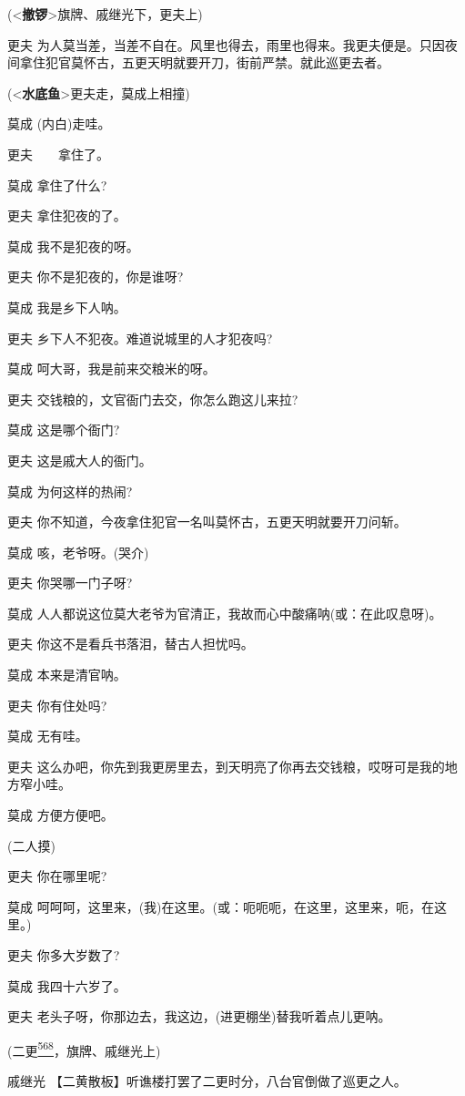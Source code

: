 (\textless{}\textbf{撤锣}\textgreater{}旗牌、戚继光下，更夫上)

更夫
为人莫当差，当差不自在。风里也得去，雨里也得来。我更夫便是。只因夜间拿住犯官莫怀古，五更天明就要开刀，街前严禁。就此巡更去者。

(\textless{}\textbf{水底鱼}\textgreater{}更夫走，莫成上相撞)

莫成 (内白)走哇。

更夫　　拿住了。

莫成 拿住了什么?

更夫 拿住犯夜的了。

莫成 我不是犯夜的呀。

更夫 你不是犯夜的，你是谁呀?

莫成 我是乡下人呐。

更夫 乡下人不犯夜。难道说城里的人才犯夜吗?

莫成 呵大哥，我是前来交粮米的呀。

更夫 交钱粮的，文官衙门去交，你怎么跑这儿来拉?

莫成 这是哪个衙门?

更夫 这是戚大人的衙门。

莫成 为何这样的热闹?

更夫 你不知道，今夜拿住犯官一名叫莫怀古，五更天明就要开刀问斩。

莫成 咳，老爷呀。(哭介)

更夫 你哭哪一门子呀?

莫成 人人都说这位莫大老爷为官清正，我故而心中酸痛呐(或：在此叹息呀)。

更夫 你这不是看兵书落泪，替古人担忧吗。

莫成 本来是清官呐。

更夫 你有住处吗?

莫成 无有哇。

更夫
这么办吧，你先到我更房里去，到天明亮了你再去交钱粮，哎呀可是我的地方窄小哇。

莫成 方便方便吧。

(二人摸)

更夫 你在哪里呢?

莫成
呵呵呵，这里来，(我)在这里。(或：呃呃呃，在这里，这里来，呃，在这里。)

更夫 你多大岁数了?

莫成 我四十六岁了。

更夫 老头子呀，你那边去，我这边，(进更棚坐)替我听着点儿更呐。

(二更\protect\hyperlink{fn568}{\textsuperscript{568}}，旗牌、戚继光上)

戚继光 【二黄散板】听谯楼打罢了二更时分，八台官倒做了巡更之人。

